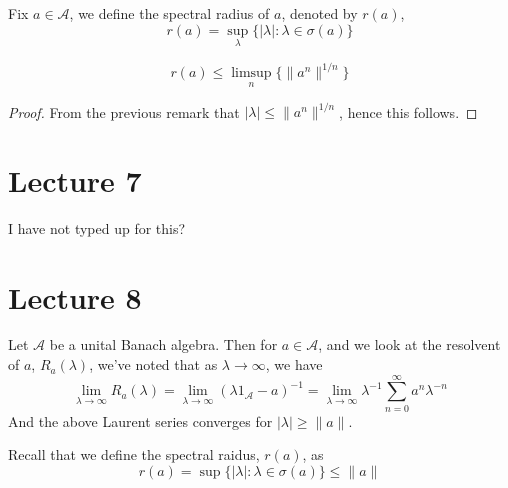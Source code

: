 \begin{definition}
    Fix $a\in\mathcal{A}$, we define the spectral radius of $a$, denoted by $r(a)$,
    \begin{equation*}
        r(a)=\sup_\lambda\{|\lambda|:\lambda\in\sigma(a)\}
    \end{equation*}
\end{definition}
\begin{corollary}
    \begin{equation*}
        r(a)\leq\limsup_n\{\|a^n\|^{1/n}\}
    \end{equation*}
\end{corollary}
\begin{proof}
From the previous remark that $|\lambda|\leq\|a^n\|^{1/n}$, hence this follows.
\end{proof}


\section{Lecture 7}
I have not typed up for this?


\section{Lecture 8}
Let $\mathcal{A}$ be a unital Banach algebra. Then for $a\in\mathcal{A}$, and we look at the resolvent of $a$, $R_a(\lambda)$, we've noted that as $\lambda\to\infty$, we have
\begin{equation*}
    \lim_{\lambda\to\infty}R_a(\lambda)=\lim_{\lambda\to\infty}(\lambda1_\mathcal{A}-a)^{-1}=\lim_{\lambda\to\infty}\lambda^{-1}\sum_{n=0}^\infty a^n\lambda^{-n}
\end{equation*}
And the above Laurent series converges for $|\lambda|\geq\|a\|$.

Recall that we define the spectral raidus, $r(a)$, as 
\begin{equation*}
    r(a)=\sup\{|\lambda|:\lambda\in\sigma(a)\}\leq\|a\|
\end{equation*}

